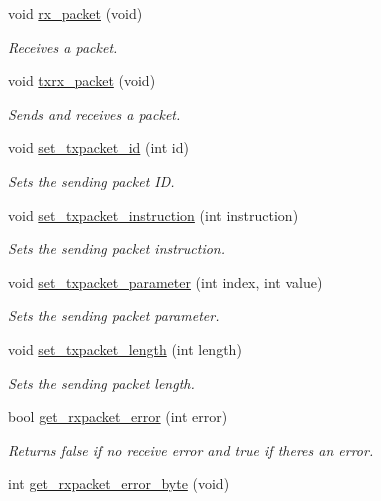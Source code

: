 \begin{DoxyCompactItemize}
void \hyperlink{classdynamixel_aa26d2d2dff768563a1cb1480aa061608}{rx\+\_\+packet} (void)
\begin{DoxyCompactList}\small\item\em Receives a packet. \end{DoxyCompactList}\item 
void \hyperlink{classdynamixel_aebfc569c6b1eb0b98f8c385f0f921fc0}{txrx\+\_\+packet} (void)
\begin{DoxyCompactList}\small\item\em Sends and receives a packet. \end{DoxyCompactList}\item 
void \hyperlink{classdynamixel_a84e24c72c3e5be866f8b28c2e5bd1d95}{set\+\_\+txpacket\+\_\+id} (int id)
\begin{DoxyCompactList}\small\item\em Sets the sending packet I\+D. \end{DoxyCompactList}\item 
void \hyperlink{classdynamixel_a209a43f983f214323b6f0a627d5e8c13}{set\+\_\+txpacket\+\_\+instruction} (int instruction)
\begin{DoxyCompactList}\small\item\em Sets the sending packet instruction. \end{DoxyCompactList}\item 
void \hyperlink{classdynamixel_a2c3d31bbbed70a69918e9972a620384b}{set\+\_\+txpacket\+\_\+parameter} (int index, int value)
\begin{DoxyCompactList}\small\item\em Sets the sending packet parameter. \end{DoxyCompactList}\item 
void \hyperlink{classdynamixel_a829278f48e21c810b172eb8cab3b86de}{set\+\_\+txpacket\+\_\+length} (int length)
\begin{DoxyCompactList}\small\item\em Sets the sending packet length. \end{DoxyCompactList}\item 
bool \hyperlink{classdynamixel_a843b0aac721e4264e7e3097f80980243}{get\+\_\+rxpacket\+\_\+error} (int error)
\begin{DoxyCompactList}\small\item\em Returns false if no receive error and true if there\textquotesingle{}s an error. \end{DoxyCompactList}\item 
int \hyperlink{classdynamixel_a6e62341ef9f51b6e152e769bd7be9d75}{get\+\_\+rxpacket\+\_\+error\+\_\+byte} (void)

\end{DoxyCompactItemize}

